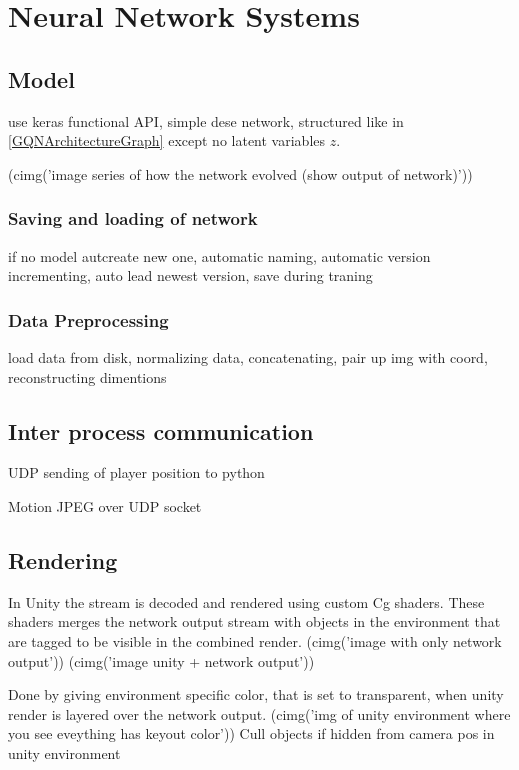 
\chapter{Neural Network Systems}
\section{Model}
use keras functional API,
simple dese network,
structured like in \ref{GQNArchitectureGraph} except no latent variables $z$.

\dl(cimg('image series of how the network evolved (show output of network)'))


\subsection{Saving and loading of network}
if no model autcreate new one,
automatic naming,
automatic version incrementing,
auto lead newest version,
save during traning


\subsection{Data Preprocessing}
load data from disk,
normalizing data,
concatenating,
pair up img with coord,
reconstructing dimentions


\section{Inter process communication}
UDP sending of player position to python

Motion JPEG over UDP socket


\section{Rendering}
In Unity the stream is decoded and rendered using custom Cg shaders. These shaders merges the network output stream with objects in the environment that are tagged to be visible in the combined render.
\dl(cimg('image with only network output'))
\dl(cimg('image unity + network output'))

Done by giving environment specific color, that is set to transparent, when unity render is layered over the network output.
\dl(cimg('img of unity environment where you see eveything has keyout color'))
Cull objects if hidden from camera pos in unity environment
